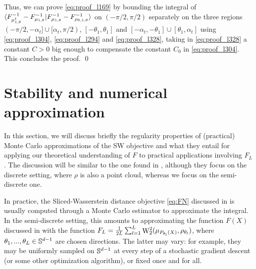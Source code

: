     Thus, we can prove \eqref{eq:proof_l169} by bounding the integral of $\langle F^{-1}_{\mu^t_{1,\theta}} - F^{-1}_{\mu_{1,\theta}}|F^{-1}_{\mu_{1,\theta}} - F^{-1}_{\rho_{\theta,1,\theta}}\rangle$ on $(-\pi/2,\pi/2)$ separately on the three regions $(-\pi/2,-\alpha_t]\cup[\alpha_t,\pi/2)$, $[-\theta_1,\theta_1]$ and $[-\alpha_t,-\theta_1]\cup[\theta_1,\alpha_t]$ using \eqref{eq:proof_l304}, \eqref{eq:proof_l294} and \eqref{eq:proof_l328}, taking in \eqref{eq:proof_l328} a constant $C > 0$ big enough to compensate the constant $C_0$ in \eqref{eq:proof_l304}. This concludes the proof. \qed

\section{Stability and numerical approximation} \label{section:numerical_approx}

In this section, we will discuss briefly the regularity properties of (practical) Monte Carlo approximations of the SW objective and what they entail for applying our theoretical understanding of $F$ to practical applications involving $F_L$. 
The discussion will be similar to the one found in \citep{tanguy2023discrete_sw_losses}, although they focus on the discrete setting, where $\rho$ is also a point cloud, whereas we focus on the semi-discrete one.

In practice, the Sliced-Wasserstein distance objective \eqref{eq:FN} discussed in  is usually computed through a Monte Carlo estimator to approximate the integral. In the semi-discrete setting, this amounts to approximating the function $F(X)$ discussed in  with the function $ F_L = \frac{1}{2L} \sum_{l=1}^L \mathop{\mathrm{W}}\nolimits^2_2(\mu_{P_{\theta_l}(X)}, \rho_{\theta_l})$, where $\theta_1,...,\theta_L \in \mathbb S^{d-1}$ are chosen directions. The latter may vary: for example, they may be uniformly sampled on $\mathbb S^{d-1}$ at every step of a stochastic gradient descent (or some other optimization algorithm), or fixed once and for all.
 
